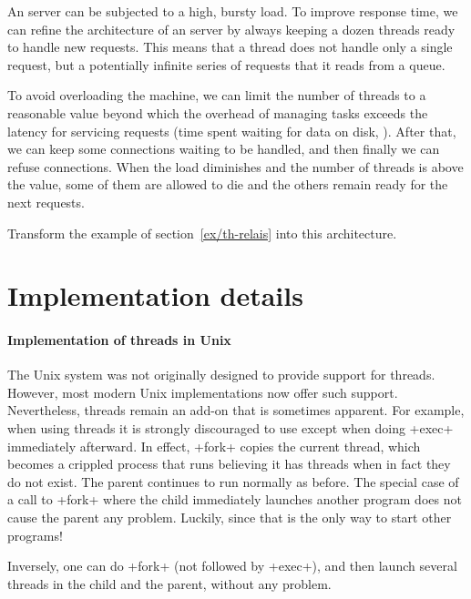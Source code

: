 \begin{exercise}[noanswer]
An {\http} server can be subjected to a high, bursty load.  To improve
response time, we can refine the architecture of an {\http} server by
always keeping a dozen threads ready to handle new requests. This means
that a thread does not handle only a single request, but a potentially
infinite series of requests that it reads from a queue.

To avoid overloading the machine, we can limit the number of threads
to a reasonable value beyond which the overhead of managing tasks
exceeds the latency for servicing requests (time spent waiting for
data on disk, \etc).  After that, we can keep some connections waiting
to be handled, and then finally we can refuse connections.  When the
load diminishes and the number of threads is above the 
value, some of them are allowed to die and the others remain ready for
the next requests.

Transform the example of section~\ref{ex/th-relais} into this architecture.
\end{exercise}


\section{Implementation details}

\paragraph {Implementation of threads in Unix}

The Unix system was not originally designed to provide support for
threads.  However, most modern Unix implementations now offer such
support.  Nevertheless, threads remain an add-on that is sometimes
apparent.  For example, when using threads it is strongly discouraged
to use  except when doing \ml+exec+ immediately afterward.
In effect, \ml+fork+ copies the current thread, which becomes a
crippled process that runs believing it has threads when in fact they
do not exist.  The parent continues to run normally as before.
The special case of a call to \ml+fork+ where the child immediately
launches another program does not cause the parent any problem.
Luckily, since that is the only way to start other programs!

Inversely, one can do \ml+fork+ (not followed by \ml+exec+), and then launch
several threads in the child and the parent, without any problem.

